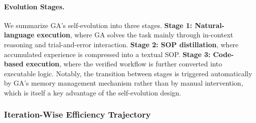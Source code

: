\paragraph{Evolution Stages.}
We summarize GA's self-evolution into three stages. \textbf{Stage 1: Natural-language execution}, where GA solves the task mainly through in-context reasoning and trial-and-error interaction. \textbf{Stage 2: SOP distillation}, where accumulated experience is compressed into a textual SOP. \textbf{Stage 3: Code-based execution}, where the verified workflow is further converted into executable logic. Notably, the transition between stages is triggered automatically by GA's memory management mechanism rather than by manual intervention, which is itself a key advantage of the self-evolution design.

\subsubsection{Iteration-Wise Efficiency Trajectory}
\label{sec:exp_iteration_trajectory}

\begin{table}[t]
\centering
\caption{\textbf{Nine-round evolution trajectory on the LangChain GitHub research task.} The experiment starts from scratch in Round \#1, iteratively refines a textual SOP in Rounds \#2--\#5, and enters the codified execution regime in Rounds \#6--\#9.}
\def\arraystretch{0.99}
\setlength{\tabcolsep}{0.42em}
\label{tab:self_evolution_rounds}
\end{table}

